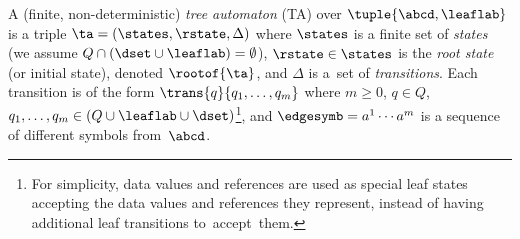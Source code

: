{A (finite, non-deterministic) \emph{tree automaton} (TA) over
$\tuple{\abcd,\leaflab}$
is a triple $\ta =
(\states, \rstate, \Delta)$ where $\states$ is a finite set of \emph{states}
(we assume $Q \cap (\dset \cup \leaflab) = \emptyset$),
$\rstate \in \states$ is the \emph{root state} (or initial state), denoted
$\rootof{\ta}$, and $\Delta$ is a~set of \emph{transitions}. Each transition is
of the form $\trans{q}{q_1, \dots, q_m}$ where $m \geq 0$, $q \in Q$,
$q_1,\ldots,q_m\in (Q \cup \leaflab \cup \dset)$\footnote{For
simplicity, data values and references are used as special leaf states accepting the
data values and references they represent, instead of having additional leaf
transitions to~accept~them.}, and $\edgesymb = a^1 \cdots a^m$ is a
sequence of different symbols from~$\abcd$. 



}
